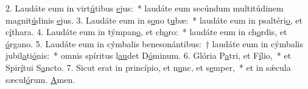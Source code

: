 2. Laudáte eum in virt\uline{ú}tibus \uline{e}jus:~* laudáte eum secúndum multitúdinem magnit\uline{ú}dinis \uline{e}jus.
3. Laudáte eum in s\uline{o}no t\uline{u}bæ:~* laudáte eum in psaltéri\uline{o}, et c\uline{í}thara.
4. Laudáte eum in týmpan\uline{o}, et ch\uline{o}ro:~* laudáte eum in ch\uline{o}rdis, et \uline{ó}rgano.
5. Laudáte eum in cýmbalis benesonántibus:~† laudáte eum in cýmbalis jubil\uline{a}ti\uline{ó}nis:~* omnis spíritus l\uline{au}det D\uline{ó}minum.
6. Glória P\uline{a}tri, et F\uline{í}lio,~* et Spir\uline{í}tui S\uline{a}ncto.
7. Sicut erat in princípio, et n\uline{u}nc, et s\uline{e}mper,~* et in sǽcula sæcul\uline{ó}rum. \uline{A}men.
